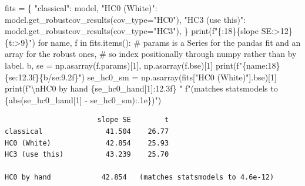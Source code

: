 \documentclass[
  letterpaper,
  10pt,
  twoside,
  openright,
  numbers=noenddot,
  chapterprefix=true]{scrbook}
\newenvironment{Shaded}{}{}
\newcommand{\BuiltInTok}[1]{\textcolor[rgb]{0.84,0.23,0.29}{#1}}
\newcommand{\CharTok}[1]{\textcolor[rgb]{0.01,0.18,0.38}{#1}}
\newcommand{\CommentTok}[1]{\textcolor[rgb]{0.42,0.45,0.49}{#1}}
\newcommand{\ControlFlowTok}[1]{\textcolor[rgb]{0.84,0.23,0.29}{#1}}
\newcommand{\DecValTok}[1]{\textcolor[rgb]{0.00,0.36,0.77}{#1}}
\newcommand{\KeywordTok}[1]{\textcolor[rgb]{0.84,0.23,0.29}{#1}}
\newcommand{\NormalTok}[1]{\textcolor[rgb]{0.14,0.16,0.18}{#1}}
\newcommand{\OperatorTok}[1]{\textcolor[rgb]{0.14,0.16,0.18}{#1}}
\newcommand{\SpecialCharTok}[1]{\textcolor[rgb]{0.00,0.36,0.77}{#1}}
\newcommand{\SpecialStringTok}[1]{\textcolor[rgb]{0.01,0.18,0.38}{#1}}
\newcommand{\StringTok}[1]{\textcolor[rgb]{0.01,0.18,0.38}{#1}}
\begin{document}
\begin{Shaded}
\begin{Highlighting}[]
\NormalTok{fits }\OperatorTok{=}\NormalTok{ \{}
    \StringTok{"classical"}\NormalTok{: model,}
    \StringTok{"HC0 (White)"}\NormalTok{: model.get\_robustcov\_results(cov\_type}\OperatorTok{=}\StringTok{"HC0"}\NormalTok{),}
    \StringTok{"HC3 (use this)"}\NormalTok{: model.get\_robustcov\_results(cov\_type}\OperatorTok{=}\StringTok{"HC3"}\NormalTok{),}
\NormalTok{\}}
\BuiltInTok{print}\NormalTok{(}\SpecialStringTok{f"}\SpecialCharTok{\{}\StringTok{\textquotesingle{}\textquotesingle{}}\SpecialCharTok{:18\}\{}\StringTok{\textquotesingle{}slope SE\textquotesingle{}}\SpecialCharTok{:\textgreater{}12\}\{}\StringTok{\textquotesingle{}t\textquotesingle{}}\SpecialCharTok{:\textgreater{}9\}}\SpecialStringTok{"}\NormalTok{)}
\ControlFlowTok{for}\NormalTok{ name, f }\KeywordTok{in}\NormalTok{ fits.items():}
    \CommentTok{\# params is a Series for the pandas fit and an array for the robust ones,}
    \CommentTok{\# so index positionally through numpy rather than by label.}
\NormalTok{    b, se }\OperatorTok{=}\NormalTok{ np.asarray(f.params)[}\DecValTok{1}\NormalTok{], np.asarray(f.bse)[}\DecValTok{1}\NormalTok{]}
    \BuiltInTok{print}\NormalTok{(}\SpecialStringTok{f"}\SpecialCharTok{\{}\NormalTok{name}\SpecialCharTok{:18\}\{}\NormalTok{se}\SpecialCharTok{:12.3f\}\{}\NormalTok{b}\OperatorTok{/}\NormalTok{se}\SpecialCharTok{:9.2f\}}\SpecialStringTok{"}\NormalTok{)}
\NormalTok{se\_hc0\_sm }\OperatorTok{=}\NormalTok{ np.asarray(fits[}\StringTok{"HC0 (White)"}\NormalTok{].bse)[}\DecValTok{1}\NormalTok{]}
\BuiltInTok{print}\NormalTok{(}\SpecialStringTok{f"}\CharTok{\textbackslash{}n}\SpecialStringTok{HC0 by hand      }\SpecialCharTok{\{}\NormalTok{se\_hc0\_hand[}\DecValTok{1}\NormalTok{]}\SpecialCharTok{:12.3f\}}\SpecialStringTok{   "}
      \SpecialStringTok{f"(matches statsmodels to }\SpecialCharTok{\{}\BuiltInTok{abs}\NormalTok{(se\_hc0\_hand[}\DecValTok{1}\NormalTok{] }\OperatorTok{{-}}\NormalTok{ se\_hc0\_sm)}\SpecialCharTok{:.1e\}}\SpecialStringTok{)"}\NormalTok{)}
\end{Highlighting}
\end{Shaded}

\begin{verbatim}
                      slope SE        t
classical               41.504    26.77
HC0 (White)             42.854    25.93
HC3 (use this)          43.239    25.70

HC0 by hand            42.854   (matches statsmodels to 4.6e-12)
\end{verbatim}
\end{document}
